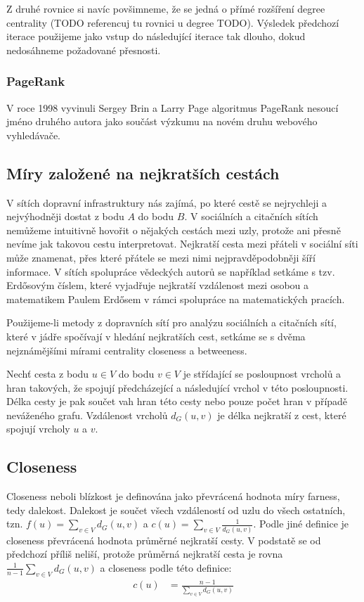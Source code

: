 \documentclass[12pt,titlepage]{report}
\begin{document}
Z druhé rovnice si navíc povšimneme, že se jedná o přímé rozšíření degree
centrality (TODO referencuj tu rovnici u degree TODO). Výsledek předchozí
iterace použijeme jako vstup do následující iterace tak dlouho, dokud
nedosáhneme požadované přesnosti.

\subsubsection{PageRank}
V roce 1998 vyvinuli Sergey Brin a Larry Page algoritmus PageRank nesoucí jméno
druhého autora jako součást výzkumu na novém druhu webového vyhledávače.

\subsection{Míry založené na nejkratších cestách}
V sítích dopravní infrastruktury nás zajímá, po které cestě se nejrychleji a
nejvýhodněji dostat z bodu $A$ do bodu $B$. V sociálních a citačních sítích
nemůžeme intuitivně hovořit o nějakých cestách mezi uzly, protože ani přesně
nevíme jak takovou cestu interpretovat. Nejkratší cesta mezi přáteli v sociální
síti může znamenat, přes které přátele se mezi nimi nejpravděpodobněji šíří
informace. V sítích spolupráce vědeckých autorů se například setkáme s tzv.
Erdősovým číslem, které vyjadřuje nejkratší vzdálenost mezi osobou a
matematikem Paulem Erdősem v rámci spolupráce na matematických pracích.

Použijeme-li metody z dopravních sítí pro analýzu sociálních a citačních sítí,
které v jádře spočívají v hledání nejkratších cest, setkáme se s dvěma
nejznámějšími mírami centrality closeness a betweeness.

Nechť cesta z bodu $u \in V$ do bodu $v \in V$ je střídající se posloupnost
vrcholů a hran takových, že spojují předcházející a následující vrchol v této
posloupnosti. Délka cesty je pak součet vah hran této cesty nebo pouze počet
hran v případě neváženého grafu. Vzdálenost vrcholů $d_G(u, v)$ je délka
nejkratší z cest, které spojují vrcholy $u$ a $v$.

\subsection{Closeness}
Closeness neboli blízkost je definována jako převrácená hodnota míry farness,
tedy dalekost. Dalekost je součet všech vzdáleností od uzlu do všech ostatních,
tzn. $f(u) = \sum_{v \in V} d_G(u, v)$ a $c(u) = \sum_{v \in V} \frac{1}{d_G(u,
v)}$. Podle jiné definice je closeness převrácená hodnota průměrné nejkratší
cesty. V podstatě se od předchozí příliš neliší, protože průměrná nejkratší
cesta je rovna $\frac{1}{n
- 1} \sum_{v \in V} d_G(u, v)$ a closeness podle této definice:
\begin{align*}
c(u) &= \frac{n - 1}{\sum_{v \in V} d_G(u, v)}
\end{align*}
\end{document}
